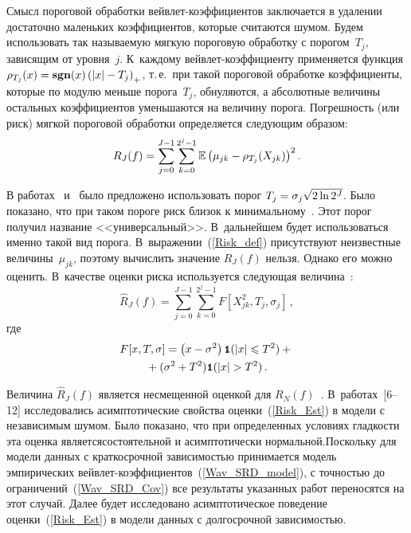 \begin{multicols}{2}
Смысл пороговой обработки вейв\-лет-ко\-эф\-фи\-ци\-ен\-тов заключается в 
удалении достаточно маленьких коэффициентов, которые считаются шумом. 
Будем использовать так называемую мягкую пороговую обработку с порогом~$T_j$, 
зависящим от уровня~$j$. К~каждому вейв\-лет-ко\-эф\-фи\-ци\-ен\-ту применяется 
функция $\rho_{T_j}(x)\hm=\textbf{sgn}(x)\left(\abs{x}-T_j\right)_{+}$, т.\,е.\ 
при такой пороговой обработке коэффициенты, которые по модулю меньше порога~$T_j$, 
обнуляются, а абсолютные величины остальных коэффициентов уменьшаются на величину 
порога. Погрешность (или риск) мягкой пороговой обработки определяется следующим образом:
\begin{equation}
R_J(f)=\sum\limits_{j=0}^{J-1}\sum\limits_{k=0}^{2^j-1}
\mathbb{E}\left(\mu_{jk}-\rho_{T_j}(X_{jk})\right)^2.
\label{Risk_def}
\end{equation}

В работах~\cite{2-she} и~\cite{3-she} было предложено использовать порог 
$T_j\hm=\sigma_j\sqrt{2\ln 2^J}$. Было показано, что при таком пороге риск 
близок к минимальному~\cite{2-she}. Этот порог получил название <<универсальный>>. 
В~дальнейшем будет использоваться именно такой вид порога. 
В~выражении~(\ref{Risk_def}) присутствуют неизвестные величины~$\mu_{jk}$, 
поэтому вычислить значение $R_J(f)$ нельзя. Однако его можно оценить. 
В~качестве оценки риска используется следующая величина~\cite{1-she}:
\begin{equation}
\widehat{R}_J(f)=\sum\limits_{j=0}^{J-1}\sum\limits_{k=0}^{2^j-1}F\left[X_{jk}^2,T_j,\sigma_j\right]\,,
\label{Risk_Est}
\end{equation}
где 
\begin{multline*}
F[x,T,\sigma]=\left(x-\sigma^2\right)\Ik(|x|\leqslant T^2)+{}\\
{}+
(\sigma^2+T^2)\Ik (|x|\hm>T^2)\,.
\end{multline*}

Величина $\widehat{R}_J(f)$ является несмещенной оценкой для $R_N(f)$~\cite{14-she}. 
В~работах~[6--12] исследовались асимптотические свойства оценки~(\ref{Risk_Est}) 
в модели с независимым шумом. Было показано, что при определенных условиях гладкости 
эта оценка является\linebreak состоятельной и асимптотически нормальной.\linebreak Поскольку для модели 
данных с краткосрочной зависимостью принимается модель эмпирических 
вейв\-лет-ко\-эф\-фи\-ци\-ен\-тов~(\ref{Wav_SRD_model}), с точностью до ограничений~(\ref{Wav_SRD_Cov}) 
все результаты указанных работ переносятся на этот случай. Далее будет исследовано асимптотическое 
поведение оценки~(\ref{Risk_Est}) в модели данных с долгосрочной зависимостью.


\end{multicols}
